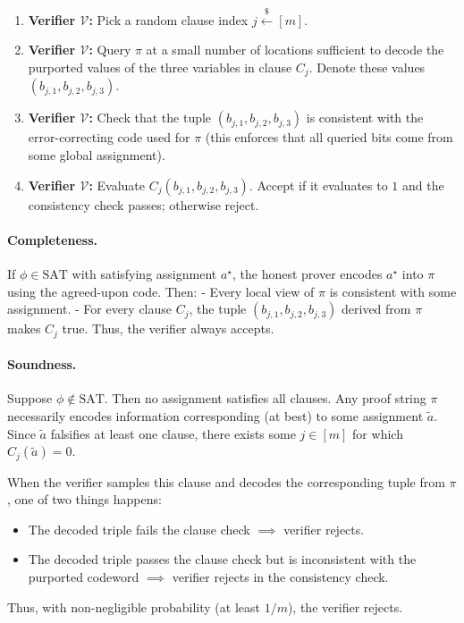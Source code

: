 \myspace

\begin{protocol}
\begin{enumerate}
  \item \textbf{Verifier $\mathcal{V}$:} Pick a random clause index $j \xleftarrow{\$}[m]$.
  
  \item \textbf{Verifier $\mathcal{V}$:} Query $\pi$ at a small number of locations sufficient to decode the purported values of the three variables in clause $C_j$. Denote these values $(b_{j,1},b_{j,2},b_{j,3})$.
  
  \item \textbf{Verifier $\mathcal{V}$:} Check that the tuple $(b_{j,1},b_{j,2},b_{j,3})$ is consistent with the error-correcting code used for $\pi$ (this enforces that all queried bits come from some global assignment).
  
  \item \textbf{Verifier $\mathcal{V}$:} Evaluate $C_j(b_{j,1},b_{j,2},b_{j,3})$.  
  Accept if it evaluates to $1$ and the consistency check passes; otherwise reject.
\end{enumerate}
\end{protocol}

\paragraph{Completeness.}
If $\phi \in \text{SAT}$ with satisfying assignment $a^\star$, the honest prover encodes $a^\star$ into $\pi$ using the agreed-upon code. Then:
- Every local view of $\pi$ is consistent with some assignment.  
- For every clause $C_j$, the tuple $(b_{j,1},b_{j,2},b_{j,3})$ derived from $\pi$ makes $C_j$ true.  
Thus, the verifier always accepts.

\paragraph{Soundness.}
Suppose $\phi \notin \text{SAT}$. Then no assignment satisfies all clauses. Any proof string $\pi$ necessarily encodes information corresponding (at best) to some assignment $\tilde{a}$. Since $\tilde{a}$ falsifies at least one clause, there exists some $j \in [m]$ for which $C_j(\tilde{a})=0$.  

When the verifier samples this clause and decodes the corresponding tuple from $\pi$, one of two things happens:
\begin{itemize}
  \item The decoded triple fails the clause check $\implies$ verifier rejects.  
  \item The decoded triple passes the clause check but is inconsistent with the purported codeword $\implies$ verifier rejects in the consistency check.  
\end{itemize}
Thus, with non-negligible probability (at least $1/m$), the verifier rejects. \\

